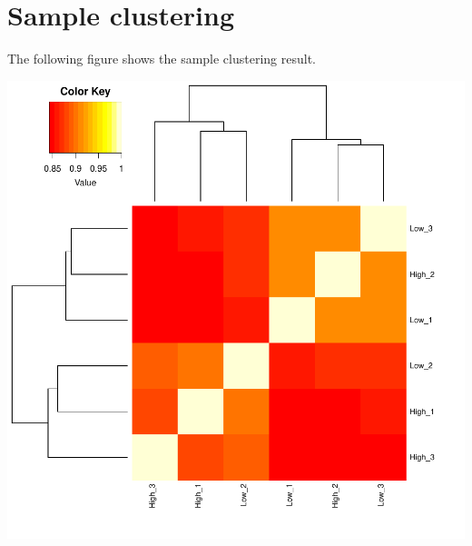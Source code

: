 \documentclass{article}
\begin{document}
\newpage\section{Sample clustering}
The following figure shows the sample clustering result.


\includegraphics{all_countsummary-009}

\end{document}
